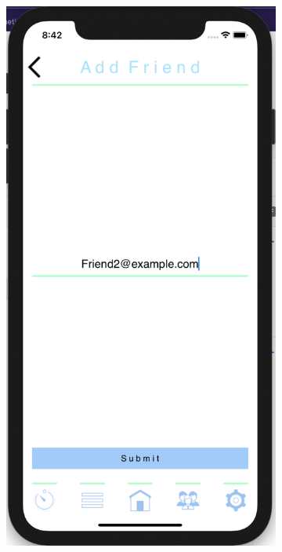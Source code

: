 \begin{figure}[H]
    \centering
    \begin{subfigure}[b]{0.3\textwidth}
        \centering
        \includegraphics[width=\textwidth]{./graphics/Implementation/Friends/add friend.png}

\end{subfigure}
\end{figure}
